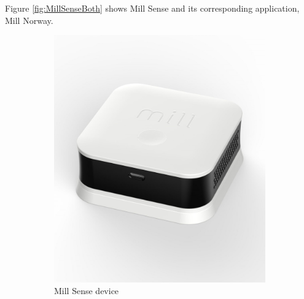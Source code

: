 Figure \ref{fig:MillSenseBoth} shows Mill Sense and its corresponding application, Mill Norway. 

\begin{figure} [H]
    \centering
    \begin{subfigure}{0.3\textwidth}
         \centering
         \includegraphics[width=1\textwidth]{figures/MillSense.jpg}
         \caption{Mill Sense device \cite{MillSense}}
         \label{fig:MillSenseDev}
     \end{subfigure}
     \hspace{2cm}
    \begin{subfigure}{0.3\textwidth}
         \centering

\end{subfigure}
\end{figure}
